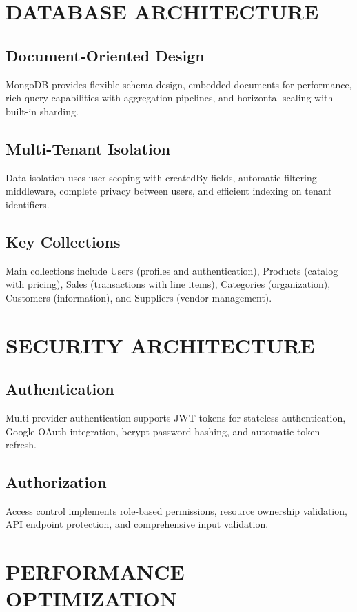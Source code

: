 \section{DATABASE ARCHITECTURE}

\subsection{Document-Oriented Design}
MongoDB provides flexible schema design, embedded documents for performance, rich query capabilities with aggregation pipelines, and horizontal scaling with built-in sharding.

\subsection{Multi-Tenant Isolation}
Data isolation uses user scoping with createdBy fields, automatic filtering middleware, complete privacy between users, and efficient indexing on tenant identifiers.

\subsection{Key Collections}
Main collections include Users (profiles and authentication), Products (catalog with pricing), Sales (transactions with line items), Categories (organization), Customers (information), and Suppliers (vendor management).

\section{SECURITY ARCHITECTURE}

\subsection{Authentication}
Multi-provider authentication supports JWT tokens for stateless authentication, Google OAuth integration, bcrypt password hashing, and automatic token refresh.

\subsection{Authorization}
Access control implements role-based permissions, resource ownership validation, API endpoint protection, and comprehensive input validation.

\section{PERFORMANCE OPTIMIZATION}

